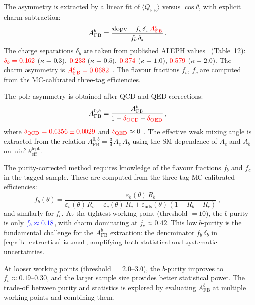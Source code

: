 \documentclass[11pt,a4paper]{article}
\newcommand{\measured}[1]{\textcolor{blue}{#1}}
\newcommand{\external}[1]{\textcolor{red}{#1}}
\begin{document}
The asymmetry is extracted by a linear fit of
$\langle Q_\text{FB}\rangle$ versus $\cos\theta$, with explicit
charm subtraction:
\begin{equation}
A_\text{FB}^b = \frac{\text{slope} -
  f_c\,\delta_c\,\external{A_\text{FB}^c}}
  {f_b\,\delta_b}\,.
\label{eq:afb_extraction}
\end{equation}
The charge separations $\delta_b$ are taken from published
ALEPH values~\cite{LEP:EWWG:2005} (Table~12):
$\external{\delta_b = 0.162}$ ($\kappa = 0.3$),
$\external{0.233}$ ($\kappa = 0.5$),
$\external{0.374}$ ($\kappa = 1.0$),
$\external{0.579}$ ($\kappa = 2.0$).
The charm asymmetry is
$\external{A_\text{FB}^c = 0.0682}$~\cite{LEP:EWWG:2005}.
The flavour fractions $f_b$, $f_c$ are computed from the
MC-calibrated three-tag efficiencies.

The pole asymmetry is obtained after QCD and QED corrections:
\begin{equation}
A_\text{FB}^{0,b} = \frac{A_\text{FB}^b}
  {1 - \external{\delta_\text{QCD}} - \external{\delta_\text{QED}}}\,,
\label{eq:afb_pole}
\end{equation}
where $\external{\delta_\text{QCD} = 0.0356 \pm 0.0029}$ and
$\external{\delta_\text{QED}} \approx 0$~\cite{LEP:EWWG:2005}.
The effective weak mixing angle is extracted from the relation
$A_\text{FB}^{0,b} = \frac{3}{4}\,A_e\,A_b$
using the SM dependence of $A_e$ and $A_b$ on
$\sin^2\theta_\text{eff}^\text{lept}$.

The purity-corrected method requires knowledge of the flavour
fractions $f_b$ and $f_c$ in the tagged sample.
These are computed from the three-tag MC-calibrated efficiencies:
\begin{equation}
f_b(\theta) = \frac{\varepsilon_b(\theta)\,R_b}
  {\varepsilon_b(\theta)\,R_b + \varepsilon_c(\theta)\,R_c +
   \varepsilon_\text{uds}(\theta)\,(1 - R_b - R_c)}\,,
\label{eq:fb_purity}
\end{equation}
and similarly for $f_c$.
At the tightest working point (threshold $= 10$), the $b$-purity
is only $\measured{f_b \approx 0.18}$, with charm dominating at
$f_c \approx 0.42$.
This low $b$-purity is the fundamental challenge for the
$A_\text{FB}^b$ extraction: the denominator
$f_b\,\delta_b$ in \cref{eq:afb_extraction} is small, amplifying
both statistical and systematic uncertainties.

At looser working points (threshold $= 2.0$--$3.0$), the
$b$-purity improves to $f_b \approx 0.19$--$0.30$, and the
larger sample size provides better statistical power.
The trade-off between purity and statistics is explored by
evaluating $A_\text{FB}^b$ at multiple working points and
combining them.
\end{document}
